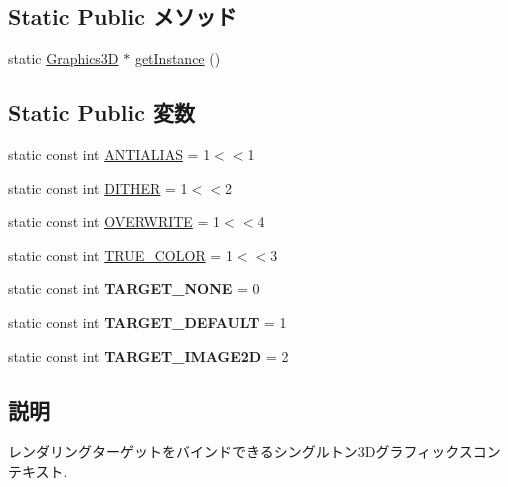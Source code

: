 \subsection*{Static Public メソッド}
\begin{CompactItemize}
\item 
static \hyperlink{classm3g_1_1Graphics3D}{Graphics3D} $\ast$ \hyperlink{classm3g_1_1Graphics3D_da6d71754bfe755dd8204a9332e9ed47}{getInstance} ()
\end{CompactItemize}
\subsection*{Static Public 変数}
\begin{CompactItemize}
\item 
static const int \hyperlink{classm3g_1_1Graphics3D_9df12c5332904e66a962e1bf2809a812}{ANTIALIAS} = 1$<$$<$1
\item 
static const int \hyperlink{classm3g_1_1Graphics3D_3750f57b82328be988bdab3b672a64f9}{DITHER} = 1$<$$<$2
\item 
static const int \hyperlink{classm3g_1_1Graphics3D_f448f7f447a301823af9170bfe84c50e}{OVERWRITE} = 1$<$$<$4
\item 
static const int \hyperlink{classm3g_1_1Graphics3D_bbd22a6baea672f895d5ef32e2438ec6}{TRUE\_\-COLOR} = 1$<$$<$3
\item 
\hypertarget{classm3g_1_1Graphics3D_6b0cb63f7c2814ea8c1938d1b9c50cfa}{
static const int \textbf{TARGET\_\-NONE} = 0}
\label{classm3g_1_1Graphics3D_6b0cb63f7c2814ea8c1938d1b9c50cfa}

\item 
\hypertarget{classm3g_1_1Graphics3D_84569f5576be7f299b00c6de2ba775d0}{
static const int \textbf{TARGET\_\-DEFAULT} = 1}
\label{classm3g_1_1Graphics3D_84569f5576be7f299b00c6de2ba775d0}

\item 
\hypertarget{classm3g_1_1Graphics3D_75fa6b63c910b61d5d3ec8c419d75ec2}{
static const int \textbf{TARGET\_\-IMAGE2D} = 2}
\label{classm3g_1_1Graphics3D_75fa6b63c910b61d5d3ec8c419d75ec2}

\end{CompactItemize}


\subsection{説明}
レンダリングターゲットをバインドできるシングルトン3Dグラフィックスコンテキスト. 


